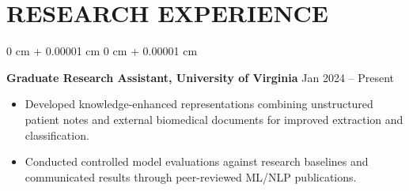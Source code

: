 \documentclass[10pt, letterpaper]{article}
\newenvironment{highlights}{
    \begin{itemize}[
        topsep=0.10 cm,
        parsep=0.10 cm,
        partopsep=0pt,
        itemsep=0pt,
        leftmargin=0 cm + 10pt
    ]
}{
    \end{itemize}
} %
\newenvironment{onecolentry}{
    \begin{adjustwidth}{
        0 cm + 0.00001 cm
    }{
        0 cm + 0.00001 cm
    }
}{
    \end{adjustwidth}
} %
\begin{document}
\section{RESEARCH EXPERIENCE}
\begin{onecolentry}
\textbf{Graduate Research Assistant, University of Virginia} \hfill Jan 2024 -- Present
\begin{highlights}
\item Developed knowledge-enhanced representations combining unstructured patient notes and external biomedical documents for improved extraction and classification.
\item Conducted controlled model evaluations against research baselines and communicated results through peer-reviewed ML/NLP publications.
\end{highlights}
\end{onecolentry}
\end{document}

